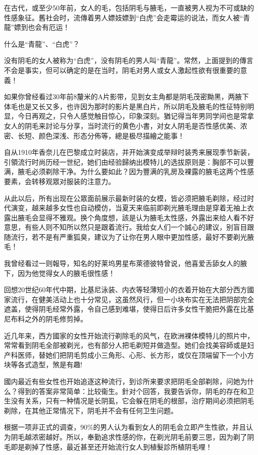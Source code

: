 \documentclass[12pt,UTF8]{ctexbook}
\begin{document}
在古代，或至少50年前，女人的毛，包括阴毛与腋毛，一直被男人视为不可或缺的性感象征。舊社会时，流傳着男人嫖妓嫖到“白虎”会走霉运的说法，而女人被“青龍”嫖到也会有厄运！

什么是“青龍”、“白虎”？

没有阴毛的女人被称为“白虎”，没有阴毛的男人叫“青龍”。常然，上面提到的傳言不会是事实，但可以确定的是在当时，阴毛对男人或女人激起性欲有很重要的意義！

如果你曾经看过30年前8釐米的A片影带，见到女主角都是阴毛茂密黝黑，两腋下体毛也是又长又多，也许因为那时的影片是黑白片，所以阴毛及腋毛的性征特别明显，今日再观之，只令人感觉触目惊心，印象深刻。猶记得当年男同学间也是常拿女人的阴毛来討论与分享，当时流行的黄色小書，对女人阴毛是否性感优美、浓密、长短、颜色深浅、形态分佈等，總是极尽描繪之能事！

自从1910年香奈儿在巴黎成立时装店，并开始演变成举辩时装秀来展现季节新装，引領流行时尚历经一世纪，她们由经验歸纳出模特儿的选拔原则是：胸部不可以豐满，腋毛必须剃除干净。为什么要如此？因为豐满的乳房及裸露的腋毛这两个性感要素，会转移观眾对服装的注意力。

从此以后，所有出现在公眾面前展示最新时装的女模，皆必须把腋毛剃除，经过时代演变，越来越多女性也自动模仿，当夏天来临前即剃光腋毛理由是穿着无袖上衣露出腋毛会显得不雅观。换个角度想，該是认为腋毛太性感，外露出来给人看不好意思，有些人则不知所以然只是跟着流行。我给女人们一个誠心的建议，别盲目跟随流行，若不是有严重狐臭，建议为了让你在男人眼中更加性感，最好不要剃光腋毛！

我曾经看过一则報导，知名的好莱坞男星布萊德彼特曾说，他喜爱舌舔女人的腋下，因为他觉得女人的腋毛很性感！

回想20世纪60年代中期，比基尼泳装、内衣等轻薄短小的衣着开始在大部分西方國家流行，在健美活动上也十分常见，这虽然风行，但一小块布实在无法把阴部完全遮盖，使得阴毛经常外露，令自己感到难堪，使得日后许多女性干脆把外露在比基尼布料之外的阴毛修剪掉。

近几年来，西方國家的女性开始流行剃除毛的风气，在欧洲裸体模特儿的照片中，常常看到阴毛全部被剃光，也有部分人把毛剃短并做造型。她们会找美容師或是妇产科医师，替她们把阴毛剪成小三角形、心形、长方形，或仅在顶端留下一个小方块等各式造型，煞是有趣!

國内最近有些女性也开始追逐这种流行，到诊所来要求把阴毛全部剃除，问她为什么？得到的答案非常简单：比较衞生。針对个回答，我要告诉你，阴毛的存在和卫生没有关系，只有一种情况是长阴虱，它会躲在阴毛的根部，治疗期间必须把阴毛剃除，在其他正常情况下，阴毛并不会有任何卫生问题。

根据一项非正式的调查，90\%的男人认为看到女人的阴毛会立即产生性欲，并且认为阴毛越浓密越好。所以，奉勤追求性感的你，在剃光阴毛前要三思，因为剃了阴毛即是剃掉了性感，最近甚至还开始流行女人到植髮診所植阴毛哩！
\end{document}
